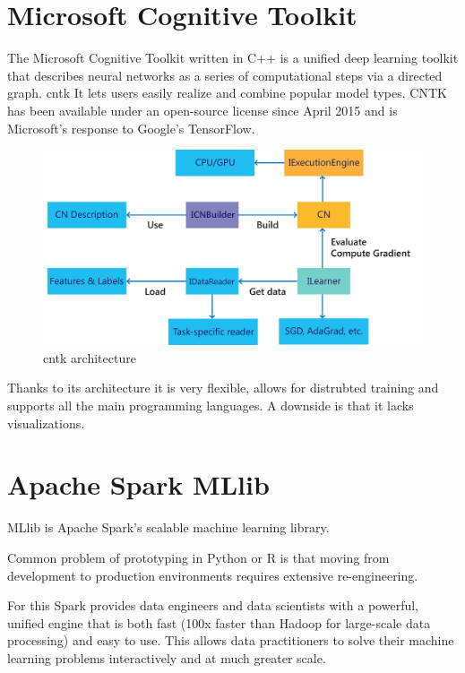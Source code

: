 \documentclass[thesis=M,english]{FITthesis}[2012/06/26]
\begin{document}
\section{Microsoft Cognitive Toolkit}

The Microsoft Cognitive Toolkit\cite{ml_cntk} written in C++ is a unified deep learning toolkit that describes neural networks as a series of computational steps via a directed graph. \acrshort{cntk} It lets users easily realize and combine popular model types. CNTK has been available under an open-source license since April 2015 and is Microsoft's response to Google's TensorFlow.


\begin{figure}[h!]\centering
	\includegraphics[width=1\textwidth]{pictures/ml_cntk_architecture}
	\caption{\acrshort{cntk} architecture \cite{ml_cntk}}\label{fig:ml_cntk_architecture}
\end{figure}

Thanks to its architecture it is very flexible, allows for distrubted training and supports all the main programming languages. A downside is that it lacks visualizations.

\section{Apache Spark MLlib}

MLlib\cite{ml_spark} is Apache Spark's scalable machine learning library.

Common\cite{ml_spark_advantages]} problem of prototyping in Python or R is that moving from development to production environments requires extensive re-engineering. 

For this Spark provides data engineers and data scientists with a powerful, unified engine that is both fast (100x faster than Hadoop for large-scale data processing) and easy to use. This allows data practitioners to solve their machine learning problems interactively and at much greater scale.\\
\end{document}
